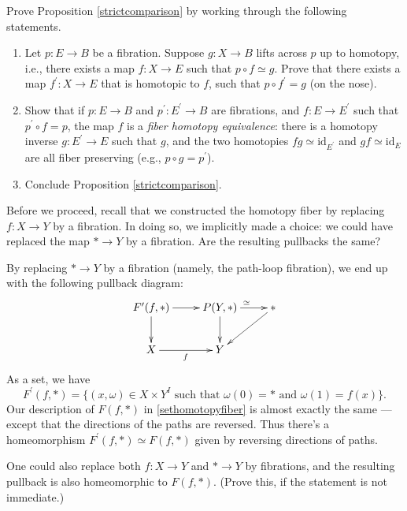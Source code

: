 \begin{exercise}\label{sectionuptohomotopy}
    Prove Proposition \ref{strictcomparison} by working through the following statements.
    \begin{enumerate}
	\item Let $p:E\to B$ be a fibration.
	    Suppose $g:X \to B$ lifts across $p$ up to homotopy, i.e., there exists a map $f:X\to E$ such that
	    $p \circ f \simeq g$.
	    Prove that there exists a map $f^\prime:X\to E$ that is homotopic to $f$, such that $p \circ f^\prime = g$
	    (on the nose).
	\item Show that if $p:E\to B$ and $p^\prime:E^\prime \to B$ are fibrations, and $f:E \to E^\prime$ such that
	    $p^\prime \circ f = p$, the map $f$ is a \emph{fiber homotopy equivalence}: there is a homotopy inverse
	    $g: E^\prime \to E$ such that $g$, and the two homotopies $fg \simeq \mathrm{id}_{E^\prime}$ and
	    $gf \simeq \mathrm{id}_{E}$ are all fiber preserving (e.g., $p\circ g = p^\prime$).
	\item Conclude Proposition \ref{strictcomparison}.
   \end{enumerate}
\end{exercise}

Before we proceed, recall that we constructed the homotopy fiber by replacing $f:X\to Y$ by a fibration.
In doing so, we implicitly made a choice: we could have replaced the map $\ast\to Y$ by a fibration.
Are the resulting pullbacks the same?

By replacing $\ast \to Y$ by a fibration (namely, the path-loop fibration), we end up with the following pullback diagram:
\begin{equation*}
    \xymatrix{
	F^\prime(f,\ast)\ar[r]\ar[d] & P(Y,\ast)\ar[r]^{\simeq}\ar[d] & \ast\ar[dl]\\
	X\ar[r]_f & Y & 
    }
\end{equation*}
As a set, we have
$$F^\prime(f,\ast) = \{(x,\omega)\in X\times Y^I\text{ such that }\omega(0) = \ast\text{ and }\omega(1) = f(x)\}.$$
Our description of $F(f,\ast)$ in \eqref{sethomotopyfiber} is almost exactly the same --- except that
the directions of the paths are reversed.
Thus there's a homeomorphism $F^\prime(f,\ast) \simeq F(f,\ast)$ given by reversing directions of paths.
\begin{remark}
    One could also replace both $f:X\to Y$ and $\ast\to Y$ by fibrations, and the resulting pullback is also homeomorphic
    to $F(f,\ast)$. (Prove this, if the statement is not immediate.)
\end{remark}

